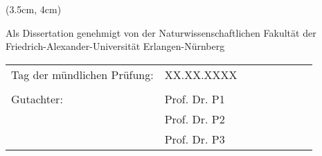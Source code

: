 
\begin{center}

    \vspace*{3cm}
   
    \begin{textblock*}{15 cm}(3.5cm, 4cm)
        \Large \begin{flushleft}
        Als Dissertation genehmigt von der Naturwissenschaftlichen Fakultät der Friedrich-Alexander-Universität Erlangen-Nürnberg
            
        \end{flushleft}
    \end{textblock*}

    \vspace{4cm}

    \vspace{1.2cm}

    \vspace*{2.5 cm}

    \begin{center}
        \large
        \begin{tabular}{>{\raggedright\arraybackslash}m{0.5\linewidth}>{\raggedright\arraybackslash}m{0.5\linewidth}}

          Tag der mündlichen Prüfung:       & XX.XX.XXXX \\\\
          Gutachter:                        & Prof. Dr. P1\\
                                            & Prof. Dr. P2\\
                                            & Prof. Dr. P3
        \end{tabular}
      \end{center}
      

    \vspace*{1 cm}



\end{center}

